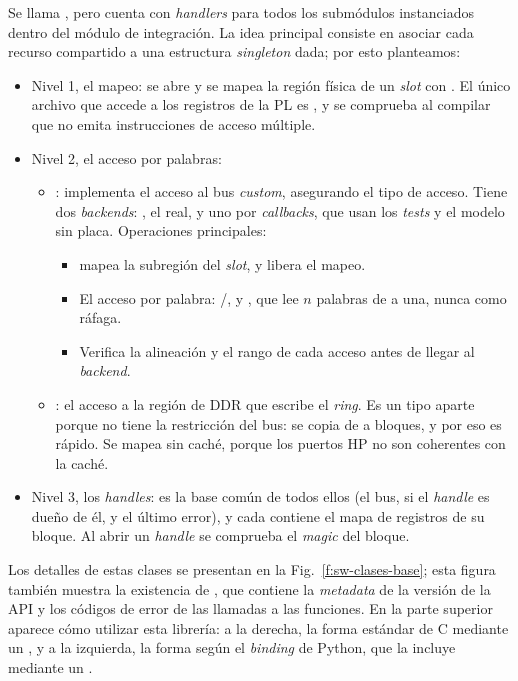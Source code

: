 Se llama , pero cuenta con \emph{handlers} para todos los submódulos
instanciados dentro del módulo de integración. La idea principal consiste en
asociar cada recurso compartido a una estructura \emph{singleton} dada; por esto
planteamos:
\begin{itemize}
  \item Nivel 1, el mapeo: se abre  y se mapea la región física
    de un \emph{slot} con . El único archivo que accede a los registros
    de la PL es , y se comprueba al compilar que no emita
    instrucciones de acceso múltiple.
  \item Nivel 2, el acceso por palabras:
  \begin{itemize}
    \item {}: implementa el acceso al bus \emph{custom}, asegurando el
      tipo de acceso. Tiene dos \emph{backends}: , el real, y uno por
      \emph{callbacks}, que usan los \emph{tests} y el modelo sin placa. Operaciones
      principales:
    \begin{itemize}
      \item {} mapea la subregión del \emph{slot}, y
         libera el mapeo.
      \item El acceso por palabra: /, y
        , que lee $n$ palabras de a una, nunca como
        ráfaga.
      \item Verifica la alineación y el rango de cada acceso antes de llegar al
        \emph{backend}.
    \end{itemize}
    \item {}: el acceso a la región de DDR que escribe el \emph{ring}.
      Es un tipo aparte porque no tiene la restricción del bus: se copia de a
      bloques, y por eso es rápido. Se mapea sin caché, porque los puertos HP no
      son coherentes con la caché.
  \end{itemize}
  \item Nivel 3, los \emph{handles}:  es la base común de todos
    ellos (el bus, si el \emph{handle} es dueño de él, y el último error), y cada
     contiene el mapa de registros de su bloque. Al abrir un
    \emph{handle} se comprueba el \emph{magic} del bloque.
\end{itemize}

Los detalles de estas clases se presentan en la Fig.~\ref{f:sw-clases-base};
esta figura también muestra la existencia de , que contiene
la \emph{metadata} de la versión de la API y los códigos de error de las llamadas a las
funciones. En la parte superior aparece cómo utilizar esta librería: a la
derecha, la forma estándar de C mediante un , y a la
izquierda, la forma según el \emph{binding} de Python, que la incluye mediante un
.

